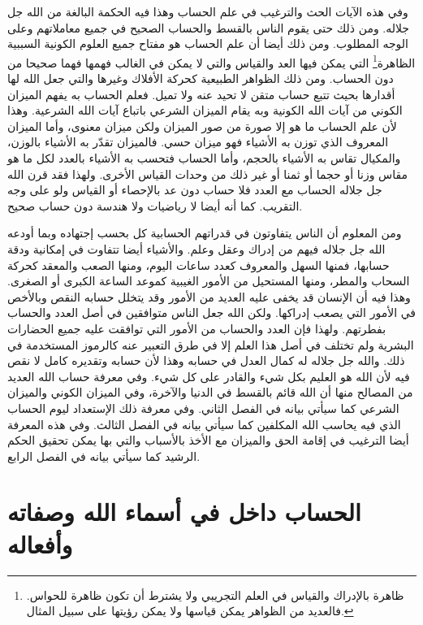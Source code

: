 وفي هذه الآيات الحث والترغيب في علم الحساب وهذا فيه الحكمة البالغة من الله جل جلاله. ومن ذلك حتى يقوم الناس بالقسط والحساب الصحيح في جميع معاملاتهم وعلى الوجه المطلوب. ومن ذلك أيضا أن علم الحساب هو مفتاح جميع العلوم الكونية السببية الظاهرة\footnote{ظاهرة بالإدراك والقياس في العلم التجريبي ولا يشترط أن تكون ظاهرة للحواس. فالعديد من الظواهر يمكن قياسها ولا يمكن رؤيتها على سبيل المثال.} التي يمكن فيها العد والقياس والتي لا يمكن في الغالب فهمها فهما صحيحا من دون الحساب. ومن ذلك الظواهر الطبيعية كحركة الأفلاك وغيرها والتي جعل الله لها أقدارها بحيث تتبع حساب متقن لا تحيد عنه ولا تميل. فعلم الحساب به يفهم الميزان الكوني من آيات الله الكونية وبه يقام الميزان الشرعي باتباع آيات الله الشرعية. وهذا لأن علم الحساب ما هو إلا صورة من صور الميزان ولكن ميزان معنوى، وأما الميزان المعروف الذي توزن به الأشياء فهو ميزان حسي. فالميزان تقدّر به الأشياء بالوزن، والمكيال تقاس به الأشياء بالحجم، وأما الحساب فتحسب به الأشياء بالعدد لكل ما هو مقاس وزنا أو حجما أو ثمنا أو غير ذلك من وحدات القياس الأخرى. ولهذا فقد قرن الله جل جلاله الحساب مع العدد فلا حساب دون عد بالإحصاء أو القياس ولو على وجه التقريب. كما أنه أيضا لا رياضيات ولا هندسة دون حساب صحيح.

ومن المعلوم أن الناس يتفاوتون في قدراتهم الحسابية كل بحسب إجتهاده وبما أودعه الله جل جلاله فيهم من إدراك وعقل وعلم. والأشياء أيضا تتفاوت في إمكانية ودقة حسابها، فمنها السهل والمعروف كعدد ساعات اليوم، ومنها الصعب والمعقد كحركة السحاب والمطر، ومنها المستحيل من الأمور الغيبية كموعد الساعة الكبرى أو الصغرى. وهذا فيه أن الإنسان قد يخفى عليه العديد من الأمور وقد يتخلل حسابه النقص وبالأخص في الأمور التي يصعب إدراكها. ولكن الله جعل الناس متوافقين في أصل العدد والحساب بفطرتهم. ولهذا فإن العدد والحساب من الأمور التي توافقت عليه جميع الحضارات البشرية ولم تختلف في أصل هذا العلم إلا في طرق التعبير عنه كالرموز المستخدمة في ذلك. والله جل جلاله له كمال العدل في حسابه وهذا لأن حسابه وتقديره كامل لا نقص فيه لأن الله هو العليم بكل شيء والقادر على كل شيء. وفي معرفة حساب الله العديد من المصالح منها أن الله قائم بالقسط في الدنيا والآخرة، وفي الميزان الكوني والميزان الشرعي كما سيأتي بيانه في الفصل الثاني. وفي معرفة ذلك الإستعداد ليوم الحساب الذي فيه يحاسب الله المكلفين كما سيأتي بيانه في الفصل الثالث. وفي هذه المعرفة أيضا الترغيب في إقامة الحق والميزان مع الأخذ بالأسباب والتي بها يمكن تحقيق الحكم الرشيد كما سيأتي بيانه في الفصل الرابع.

\section{الحساب داخل في أسماء الله وصفاته وأفعاله}

